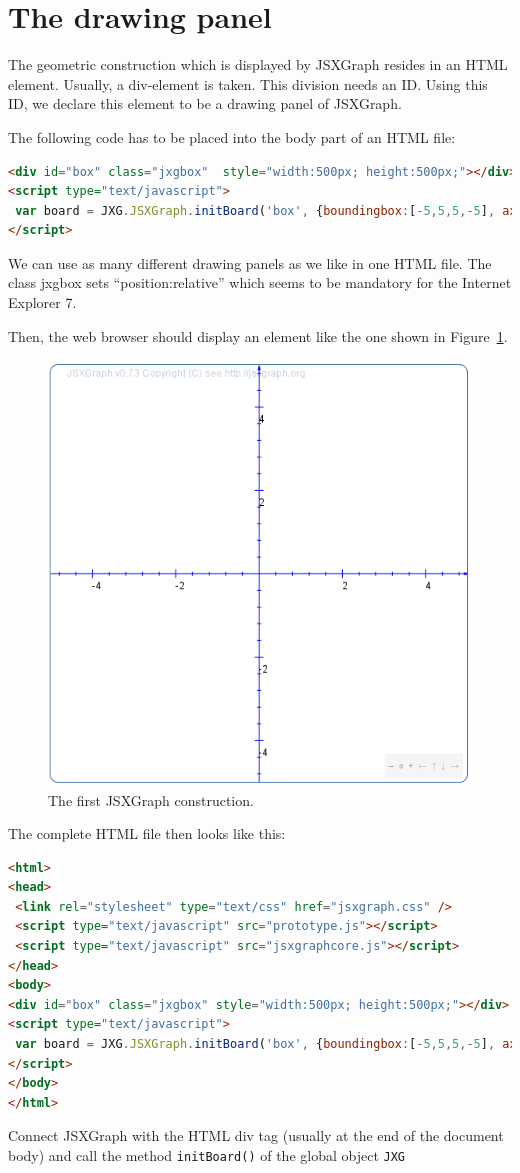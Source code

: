 \documentclass[a4paper]{tufte-book}
\begin{document}
\section{The drawing panel}

The geometric construction which is displayed by JSXGraph resides in an HTML element. Usually, a div-element is taken. This division needs an ID. Using this ID, we declare this element to be a drawing panel of JSXGraph.

The following code has to be placed into the body part of an HTML file:
\begin{fullwidth}\begin{lstlisting}[language=HTML]
<div id="box" class="jxgbox"  style="width:500px; height:500px;"></div>
<script type="text/javascript"> 
 var board = JXG.JSXGraph.initBoard('box', {boundingbox:[-5,5,5,-5], axis:true});
</script>
\end{lstlisting}\end{fullwidth}
We can use as many different drawing panels as we like in one HTML file. The class jxgbox sets ``position:relative'' which seems to be mandatory for the Internet Explorer 7. 

Then, the web browser should display an element like the one shown in Figure~\ref{fig:1}.
\begin{figure}[htb]
\centerline{\includegraphics[width=0.4\linewidth]{images/b2.png}}
\caption{The first JSXGraph construction.}\label{fig:1}
\end{figure}

The complete HTML file then looks like this:
\begin{fullwidth}\begin{lstlisting}[language=HTML]
<html>
<head>
 <link rel="stylesheet" type="text/css" href="jsxgraph.css" />
 <script type="text/javascript" src="prototype.js"></script>
 <script type="text/javascript" src="jsxgraphcore.js"></script>
</head>
<body>
<div id="box" class="jxgbox" style="width:500px; height:500px;"></div>
<script type="text/javascript">
 var board = JXG.JSXGraph.initBoard('box', {boundingbox:[-5,5,5,-5], axis:true});
</script>
</body>
</html>
\end{lstlisting}\end{fullwidth}
Connect JSXGraph with the HTML div tag (usually at the end of the document body) and call 
the method \lstinline|initBoard()| of the global object \lstinline|JXG|
\end{document}
